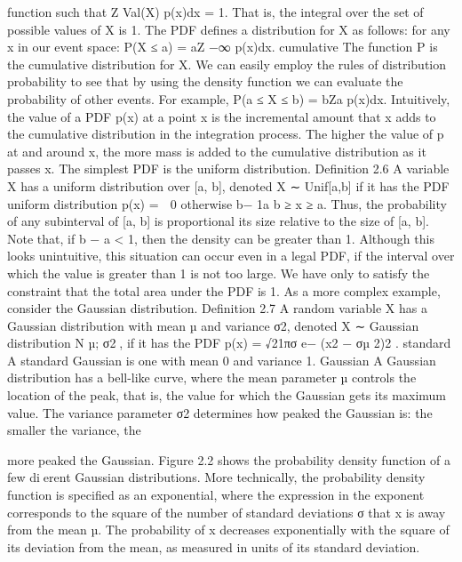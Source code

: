 function such that Z Val(X) p(x)dx = 1. That is, the integral over the set of possible values of X is 1. The PDF defines a distribution for X as follows: for any x in our event space: P(X ≤ a) = aZ −∞ p(x)dx. cumulative The function P is the cumulative distribution for X. We can easily employ the rules of distribution probability to see that by using the density function we can evaluate the probability of other events. For example, P(a ≤ X ≤ b) = bZa p(x)dx. Intuitively, the value of a PDF p(x) at a point x is the incremental amount that x adds to the cumulative distribution in the integration process. The higher the value of p at and around x, the more mass is added to the cumulative distribution as it passes x. The simplest PDF is the uniform distribution. Definition 2.6 A variable X has a uniform distribution over [a, b], denoted X ∼ Unif[a,b] if it has the PDF uniform distribution p(x) =  0 otherwise b− 1a b ≥ x ≥ a. Thus, the probability of any subinterval of [a, b] is proportional its size relative to the size of [a, b]. Note that, if b − a < 1, then the density can be greater than 1. Although this looks unintuitive, this situation can occur even in a legal PDF, if the interval over which the value is greater than 1 is not too large. We have only to satisfy the constraint that the total area under the PDF is 1. As a more complex example, consider the Gaussian distribution. Definition 2.7 A random variable X has a Gaussian distribution with mean µ and variance σ2, denoted X ∼ Gaussian distribution N µ; σ2, if it has the PDF p(x) = √21πσ e− (x2 − σµ 2)2 . standard A standard Gaussian is one with mean 0 and variance 1. Gaussian A Gaussian distribution has a bell-like curve, where the mean parameter µ controls the location of the peak, that is, the value for which the Gaussian gets its maximum value. The variance parameter σ2 determines how peaked the Gaussian is: the smaller the variance, the


more peaked the Gaussian. Figure 2.2 shows the probability density function of a few dierent Gaussian distributions. More technically, the probability density function is specified as an exponential, where the expression in the exponent corresponds to the square of the number of standard deviations σ that x is away from the mean µ. The probability of x decreases exponentially with the square of its deviation from the mean, as measured in units of its standard deviation.

